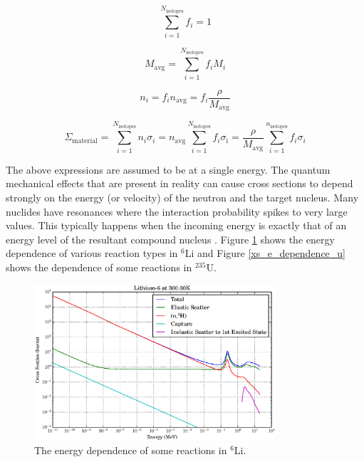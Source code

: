 \begin{equation}
\sum_{i=1}^{N_\mathrm{isotopes}} f_i =1
\label{fraction_norm}
\end{equation}

\begin{equation}
M_\mathrm{avg} = \sum_{i=1}^{N_\mathrm{isotopes}} f_i M_i
\label{mass_avg}
\end{equation}

\begin{equation}
n_i = f_i n_\mathrm{avg} = f_i \frac{\rho}{M_\mathrm{avg}}
\label{number_avg}
\end{equation}

\begin{equation}
\Sigma_{\mathrm{material}} = \sum_{i=1}^{N_\mathrm{isotopes}} n_i \sigma_i = n_\mathrm{avg} \sum_{i=1}^{N_\mathrm{isotopes}} f_i \sigma_\mathrm{i} = \frac{\rho}{M_\mathrm{avg}} \sum_{i=1}^{n_\mathrm{isotopes}} f_i \sigma_i 
\label{material_sum_xs}
\end{equation}

The above expressions are assumed to be at a single energy. The quantum mechanical effects that are present in reality can cause cross sections to depend strongly on the energy (or velocity) of the neutron and the target nucleus.  Many nuclides have resonances where the interaction probability spikes to very large values.  This typically happens when the incoming energy is exactly that of an energy level of the resultant compound nucleus \cite{duderstadt}.   Figure \ref{xs_e_dependence_li} shows the energy dependence of various reaction types in $^6$Li and Figure \ref{xs_e_dependence_u} shows the dependence of some reactions in $^{235}$U.  

\begin{figure}[h!]
  \centering
    \includegraphics[width=0.8\textwidth]{graphics/xs_li6.eps}
     \caption{The energy dependence of some reactions in $^6$Li.\label{xs_e_dependence_li}}
\end{figure}

